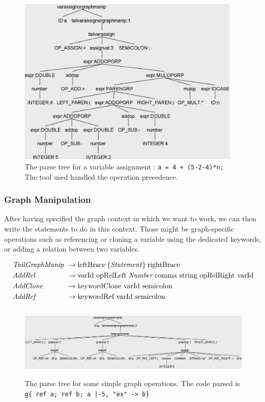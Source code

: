\begin{figure}[H]
    \centering
    \includegraphics[height = 8cm]{figures/parse_trees/parseTree_varAssign}
    \caption{The parse tree for a variable assignment :  \texttt{a = 4 + (5-2-4)*n;} \\The tool used handled the operation precedence.}
    \label{fig:parseTree_varAssign}
\end{figure}

\subsubsection*{Graph Manipulation}

After having specified the graph context in which we want to work, we can then write the statements to do in this context.
Those might be graph-specific operations such as referencing or cloning a variable using the dedicated keywords, or adding a relation between two variables.

\begin{align*}
    \omit $\mathit{TailGraphManip}$ \hfil &\rightarrow \text{leftBrace} \: \{ \mathit{Statement} \}  \: \text{rightBrace} \\
    \omit $\mathit{AddRel}$ \hfil & \rightarrow \text{varId opRelLeft} \: \mathit{Number} \: \text{comma string opRelRight varId} \\
    \omit $\mathit{AddClone}$ \hfil & \rightarrow \text{keywordClone varId semicolon} \\
    \omit $\mathit{AddRef}$ \hfil & \rightarrow \text{keywordRef varId semicolon}
\end{align*}

\begin{figure}[H]
    \centering
    \includegraphics[height = 3.5cm]{figures/parse_trees/parseTree_graphManip}
    \caption{The parse tree for some simple graph operations. The code parsed is \texttt{g\{
        ref a;
        ref b;
        a |-5, "ex" -> b\} }}
    \label{fig:parseTree_graphManip}
\end{figure}

